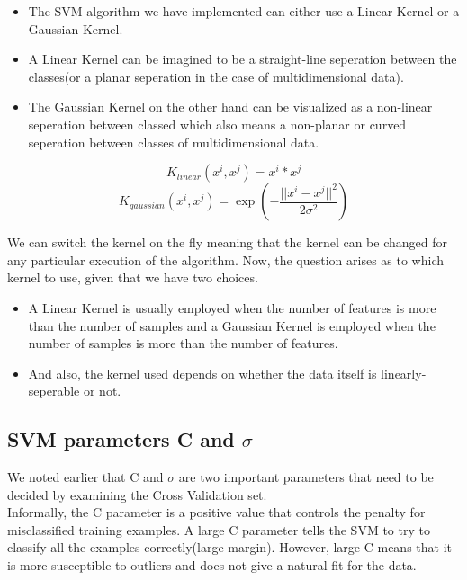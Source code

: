\documentclass[11pt,a4paper]{report}
\begin{document}
{\bigskip
\begin{itemize}
\item The SVM algorithm we have implemented can either use a Linear Kernel or a Gaussian Kernel.\\
\item A Linear Kernel can be imagined to be a straight-line seperation between the classes(or a planar seperation in the case of multidimensional data).\\
\item The Gaussian Kernel on the other hand can be visualized as a non-linear seperation between classed which also means a non-planar or curved seperation between classes of multidimensional data.\\
\end{itemize}
\begin{equation}K_{linear}(x^i, x^j) = x^i * x^j\end{equation}
\begin{equation}K_{gaussian}(x^i, x^j) = \exp(-\frac{||x^i - x^j||^2}{2\sigma^2})\end{equation}

\bigskip

We can switch the kernel on the fly meaning that the kernel can be changed for any particular execution of the algorithm. Now, the question arises as to which kernel to use, given that we have two choices.\\
\bigskip       
\begin{itemize}       
\item  A Linear Kernel is usually employed when the number of features is more than the number of samples and a Gaussian Kernel is employed when the number of samples is more than the number of features.\\
\item And also, the kernel used depends on whether the data itself is linearly-seperable or not.\\
\end{itemize}


\subsection{SVM parameters C and $\sigma$}

We noted earlier that C and $\sigma$ are two important parameters that need to be decided by examining the Cross Validation set.\\  

Informally, the C parameter is a positive value that controls the penalty for misclassified training examples.  A large C parameter tells the SVM to try to classify all the examples correctly(large margin). However, large C means that it is more susceptible to outliers and does not give a natural fit for the data.\\

}
\end{document}
